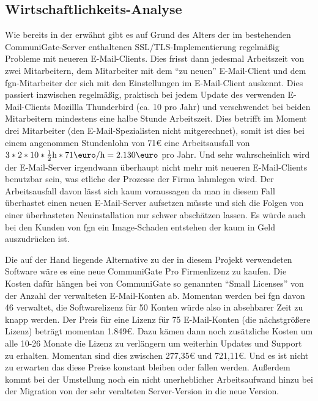 \documentclass[11pt,a4paper,titlepage=firstiscover,headsepline,bibtotoc]{scrartcl} %
\begin{document}
\subsection{Wirtschaftlichkeits-Analyse}
Wie bereits in der  erwähnt gibt es auf Grund des Alters der im bestehenden CommuniGate-Server enthaltenen SSL/TLS-Implementierung regelmäßig Probleme mit neueren E-Mail-Clients. Dies frisst dann jedesmal Arbeitszeit von zwei Mitarbeitern, dem Mitarbeiter mit dem ``zu neuen'' E-Mail-Client und dem fgn-Mitarbeiter der sich mit den Einstellungen im E-Mail-Client auskennt. Dies passiert inzwischen regelmäßig, praktisch bei jedem Update des verwenden E-Mail-Clients Mozillla Thunderbird (ca. 10 pro Jahr) und verschwendet bei beiden Mitarbeitern mindestens eine halbe Stunde Arbeitszeit. Dies betrifft im Moment drei Mitarbeiter (den E-Mail-Spezialisten nicht mitgerechnet), somit ist dies bei einem angenommen Stundenlohn von 71\mbox{\euro} eine Arbeitsausfall von \(3*2*10*\frac{1}{2}\mbox{h}*71\mbox{\euro}/\mbox{h}=2.130\mbox{\euro}\) pro Jahr. Und sehr wahrscheinlich wird der E-Mail-Server irgendwann überhaupt nicht mehr mit neueren E-Mail-Clients benutzbar sein, was etliche der Prozesse der Firma lahmlegen wird. Der Arbeitsausfall davon lässt sich kaum voraussagen da man in diesem Fall überhastet einen neuen E-Mail-Server aufsetzen müsste und sich die Folgen von einer überhasteten Neuinstallation nur schwer abschätzen lassen. Es würde auch bei den Kunden von fgn ein Image-Schaden entstehen der kaum in Geld auszudrücken ist.

Die auf der Hand liegende Alternative zu der in diesem Projekt verwendeten Software wäre es eine neue CommuniGate Pro Firmenlizenz zu kaufen. Die Kosten dafür hängen bei von CommuniGate so genannten ``Small Licenses'' von der Anzahl der verwalteten E-Mail-Konten ab. Momentan werden bei fgn davon 46 verwaltet, die Softwarelizenz für 50 Konten würde also in absehbarer Zeit zu knapp werden. Der Preis für eine Lizenz für 75 E-Mail-Konten (die nächstgrößere Lizenz) beträgt momentan 1.849\euro. Dazu kämen dann noch zusätzliche Kosten um alle 10-26 Monate die Lizenz zu verlängern um weiterhin Updates und Support zu erhalten. Momentan sind dies zwischen 277,35\euro{} und 721,11\euro. Und es ist nicht zu erwarten das diese Preise konstant bleiben oder fallen werden. Außerdem kommt bei der Umstellung noch ein nicht unerheblicher Arbeitsaufwand hinzu bei der Migration von der sehr veralteten Server-Version in die neue Version.
\end{document}
